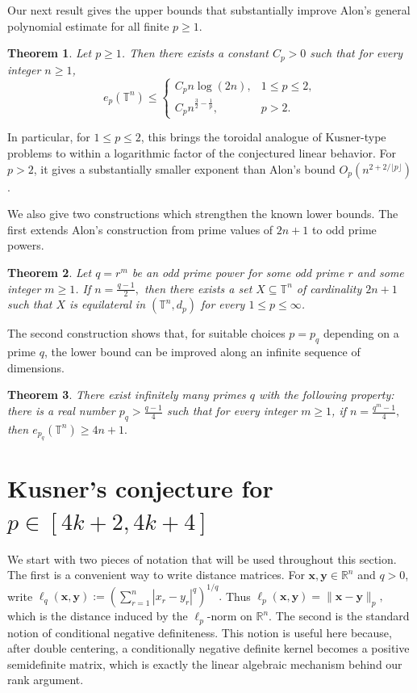 \documentclass[11pt]{article}
\newtheorem{theorem}{Theorem}[section]
\theoremstyle{definition}
\newcommand{\T}{\mathbb T}
\begin{document}
Our next result gives the upper bounds that substantially improve Alon's
general polynomial estimate for all finite \(p\ge 1\).

\begin{theorem}\label{thm:torus-nlogn-ple2}
Let \(p\ge 1\). Then there exists a constant \(C_p>0\) such that for every
integer \(n\ge1\),
\[
e_p(\T^n)\le
\begin{cases}
C_p n\log(2n),&1\le p\le 2,\\[1mm]
C_p n^{\frac{3}{2}-\frac{1}{p}},&p>2.
\end{cases}
\]
\end{theorem}
In particular, for \(1\le p\le2\), this brings the toroidal analogue of
Kusner-type problems to within a logarithmic factor of the conjectured linear
behavior.  For \(p>2\), it gives a substantially smaller exponent than Alon's
bound \(O_p(n^{2+2/\lfloor p\rfloor})\).

We also give two constructions which strengthen the known lower bounds.  The
first extends Alon's construction from prime values of \(2n+1\) to odd prime
powers.

\begin{theorem}\label{thm:odd-prime-power-lower-bound}
Let $q=r^{m}$ be an odd prime power
for some odd prime $r$ and some integer $m\ge 1$.
If
\(
n=\frac{q-1}{2},
\)
then there exists a set \(X\subseteq \mathbb T^n\) of cardinality
\(2n+1\)
such that \(X\) is equilateral in \((\mathbb T^n,d_p)\) for every
\(1\le p\le \infty\). 
\end{theorem}

The second construction shows that, for suitable choices \(p=p_q\) depending
on a prime \(q\), the lower bound can be improved 
along an infinite sequence of dimensions.

\begin{theorem}\label{thm:lower-bound-4n-plus-1}
There exist infinitely many primes \(q\) with the following property: there is a real number
\(
p_q>\frac{q-1}{4}
\)
such that for every integer \(m\ge1\), if
\(
n=\frac{q^m-1}{4},
\)
then
\(
e_{p_q}(\T^n)\ge 4n+1.
\)
\end{theorem}









\section{Kusner's conjecture for \(p\in [4k+2,4k+4]\)}
We start with two pieces of notation that will be used throughout this section.
The first is a convenient way to write distance matrices.  For
$\boldsymbol{x},\boldsymbol{y}\in \mathbb R^n$ and $q>0$, write
\(
\ell_q(\boldsymbol{x},\boldsymbol{y})
:=
(\sum_{r=1}^n |x_r-y_r|^q)^{1/q}.
\)
Thus
\(
\ell_p(\boldsymbol{x},\boldsymbol{y})
=
\|\boldsymbol{x}-\boldsymbol{y}\|_p,
\)
which is the distance induced by the
\(\ell_p\)-norm on \(\mathbb R^n\).
The second is the standard notion of conditional negative definiteness.  This
notion is useful here because, after double centering, a conditionally negative
definite kernel becomes a positive semidefinite matrix, which is exactly the
linear algebraic mechanism behind our rank argument.
\end{document}
